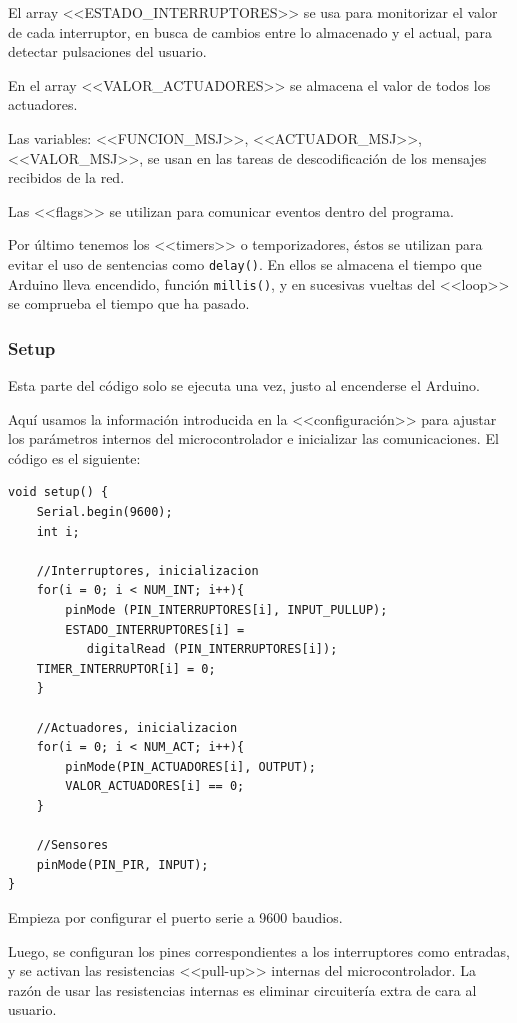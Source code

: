 El array <<ESTADO\_INTERRUPTORES>> se usa para monitorizar el valor de cada interruptor, en busca de cambios entre lo almacenado y el actual, para detectar pulsaciones del usuario.

En el array <<VALOR\_ACTUADORES>> se almacena el valor de todos los actuadores.

Las variables: <<FUNCION\_MSJ>>, <<ACTUADOR\_MSJ>>, <<VALOR\_MSJ>>, se usan en las tareas de descodificación de los mensajes recibidos de la red.

Las <<flags>> se utilizan para comunicar eventos dentro del programa.

Por último tenemos los <<timers>> o temporizadores, éstos se utilizan para evitar el uso de sentencias como \lstinline[]|delay()|. En ellos se almacena el tiempo que Arduino lleva encendido, función \lstinline|millis()|, y en sucesivas vueltas del <<loop>> se comprueba el tiempo que ha pasado.


\subsubsection{Setup}
Esta parte del código solo se ejecuta una vez, justo al encenderse el Arduino.

Aquí usamos la información introducida en la <<configuración>> para ajustar los parámetros internos del microcontrolador e inicializar las comunicaciones. El código es el siguiente:

\begin{lstlisting}
void setup() {
    Serial.begin(9600);
    int i;
    
    //Interruptores, inicializacion
    for(i = 0; i < NUM_INT; i++){
        pinMode (PIN_INTERRUPTORES[i], INPUT_PULLUP);
        ESTADO_INTERRUPTORES[i] = 
           digitalRead (PIN_INTERRUPTORES[i]);
    TIMER_INTERRUPTOR[i] = 0;
    }
    
    //Actuadores, inicializacion
    for(i = 0; i < NUM_ACT; i++){
        pinMode(PIN_ACTUADORES[i], OUTPUT);
        VALOR_ACTUADORES[i] == 0;
    }
    
    //Sensores
    pinMode(PIN_PIR, INPUT);
}
\end{lstlisting}

Empieza por configurar el puerto serie a 9600 baudios. 

Luego, se configuran los pines correspondientes a los interruptores como entradas, y se activan las resistencias <<pull-up>> internas del microcontrolador. La razón de usar las resistencias internas es eliminar circuitería extra de cara al usuario.

